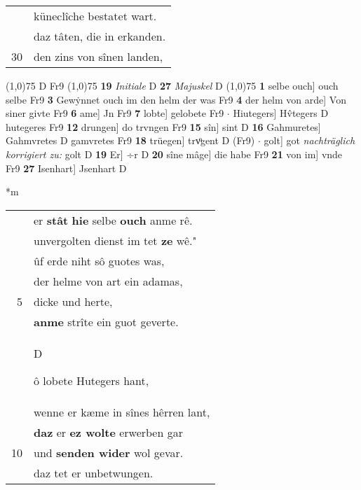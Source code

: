 \documentclass[8pt,a4paper,notitlepage]{article}
\begin{document}
\begin{table}[ht]
\begin{minipage}[t]{0.5\linewidth}
\begin{tabular}{rl}
 & küneclîche bestatet wart.\\ 
 & daz tâten, die in erkanden.\\ 
30 & den zins von sînen landen,\\ 
\end{tabular}
\scriptsize
\line(1,0){75} \newline
D Fr9 \newline
\line(1,0){75} \newline
\textbf{19} \textit{Initiale} D  \textbf{27} \textit{Majuskel} D  \newline
\line(1,0){75} \newline
\textbf{1} selbe ouch] ouch selbe Fr9 \textbf{3} Gewẏnnet ouch im den helm der was Fr9 \textbf{4} der helm von arde] Von siner givte Fr9 \textbf{6} ame] Jn Fr9 \textbf{7} lobte] gelobete Fr9  $\cdot$ Hiutegers] Hv̂tegers D hutegeres Fr9 \textbf{12} drungen] do trvngen Fr9 \textbf{15} sîn] sint D \textbf{16} Gahmuretes] Gahmvretes D gamvretes Fr9 \textbf{18} trüegen] trvͦgent D (Fr9)  $\cdot$ golt] got \textit{nachträglich korrigiert zu:} golt D \textbf{19} Er] ÷r D \textbf{20} sîne mâge] die habe Fr9 \textbf{21} von im] vnde Fr9 \textbf{27} Isenhart] Jsenhart D \newline
\end{minipage}
\hspace{0.5cm}
\begin{minipage}[t]{0.5\linewidth}
\small
\begin{center}*m
\end{center}
\begin{tabular}{rl}
 & er \textbf{stât} \textbf{hie} selbe \textbf{ouch} anme rê.\\ 
 & unvergolten dienst im tet \textbf{ze} wê."\\ 
 & ûf erde niht sô guotes was,\\ 
 & der helme von art ein adamas,\\ 
5 & dicke und herte,\\ 
 & \textbf{anme} strîte ein guot geverte.\\ 
 & \begin{large}D\end{large}ô lobete Hutegers hant,\\ 
 & wenne er kæme in sînes hêrren lant,\\ 
 & \textbf{daz} er \textbf{ez wolte} erwerben gar\\ 
10 & und \textbf{senden wider} wol gevar.\\ 
 & daz tet er unbetwungen.\\ 

\end{tabular}
\end{minipage}
\end{table}
\end{document}
